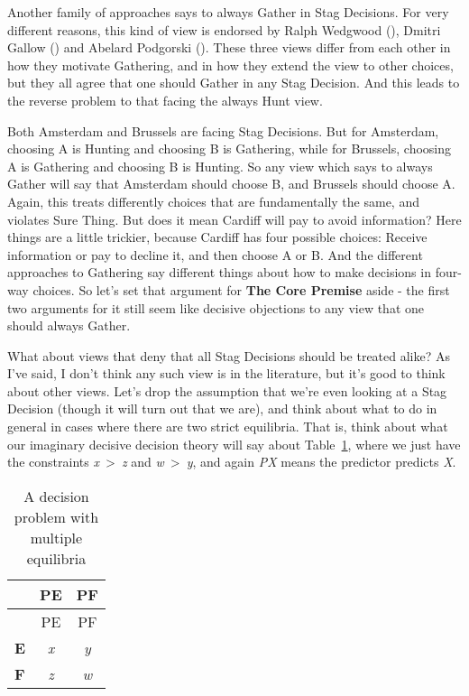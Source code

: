 \documentclass[
  10pt,
  letterpaper,
  DIV=11,
  numbers=noendperiod,
  twoside]{scrartcl}
\begin{document}
Another family of approaches says to always Gather in Stag Decisions.
For very different reasons, this kind of view is endorsed by Ralph
Wedgwood (), Dmitri Gallow
() and Abelard Podgorski
(). These three views differ from each
other in how they motivate Gathering, and in how they extend the view to
other choices, but they all agree that one should Gather in any Stag
Decision. And this leads to the reverse problem to that facing the
always Hunt view.

Both Amsterdam and Brussels are facing Stag Decisions. But for
Amsterdam, choosing A is Hunting and choosing B is Gathering, while for
Brussels, choosing A is Gathering and choosing B is Hunting. So any view
which says to always Gather will say that Amsterdam should choose B, and
Brussels should choose A. Again, this treats differently choices that
are fundamentally the same, and violates Sure Thing. But does it mean
Cardiff will pay to avoid information? Here things are a little
trickier, because Cardiff has four possible choices: Receive information
or pay to decline it, and then choose A or B. And the different
approaches to Gathering say different things about how to make decisions
in four-way choices. So let's set that argument for \textbf{The Core
Premise} aside - the first two arguments for it still seem like decisive
objections to any view that one should always Gather.

What about views that deny that all Stag Decisions should be treated
alike? As I've said, I don't think any such view is in the literature,
but it's good to think about other views. Let's drop the assumption that
we're even looking at a Stag Decision (though it will turn out that we
are), and think about what to do in general in cases where there are two
strict equilibria. That is, think about what our imaginary decisive
decision theory will say about Table~\ref{tbl-two-eqm}, where we just
have the constraints \emph{x}~\textgreater~\emph{z} and
\emph{w}~\textgreater~\emph{y}, and again \emph{PX} means the predictor
predicts \emph{X}.

\begin{longtable}[]{@{}lcc@{}}
\caption{A decision problem with multiple
equilibria}\label{tbl-two-eqm}\tabularnewline
\toprule\noalign{}
& PE & PF \\
\midrule\noalign{}
\endfirsthead
\toprule\noalign{}
& PE & PF \\
\midrule\noalign{}
\endhead
\bottomrule\noalign{}
\endlastfoot
\textbf{E} & \emph{x} & \emph{y} \\
\textbf{F} & \emph{z} & \emph{w} \\
\end{longtable}
\end{document}
